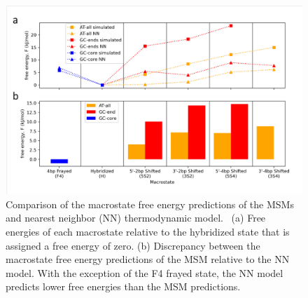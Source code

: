 \documentclass[journal=jpcbfk,manuscript=article]{achemso}
\newcommand*{\bood}[1]{{\color{blue}{#1}}}
\newcommand*{\noteb}[1]{\textcolor{blue}{[[#1]]}}		%
\begin{document}


\begin{figure}[ht!]
	\begin{center} 
        \includegraphics[width=160mm, scale=1]{Fig3.pdf}
        \caption{Comparison of the macrostate free energy predictions of the MSMs and nearest neighbor (NN) thermodynamic model.~\citep{SantaLucia1998AThermodynamics, Santalucia2004TM} (a) Free energies of each macrostate relative to the hybridized state that is assigned a free energy of zero. (b) Discrepancy between the macrostate free energy predictions of the MSM relative to the NN model. With the exception of the F4 frayed state, the NN model predicts lower free energies than the MSM predictions.}
        \label{fig:NN_table}
	\end{center}
\end{figure}
\end{document}
